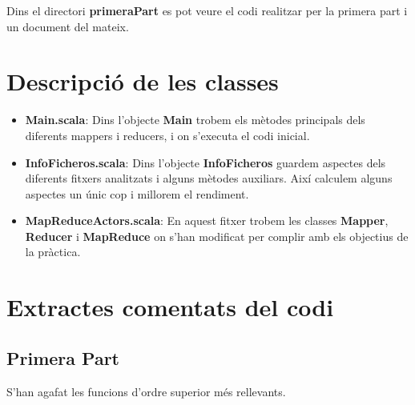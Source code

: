 \documentclass[11pt,a4paper]{article}
\begin{document}
Dins el directori \textbf{primeraPart} es pot veure el codi realitzar per la primera part i un document del mateix.

\section{Descripció de les classes}

\begin{itemize}

	\item \textbf{Main.scala}: Dins l'objecte \textbf{Main} trobem els mètodes principals dels diferents mappers i reducers, i on s'executa el codi inicial.
	\item \textbf{InfoFicheros.scala}: Dins l'objecte \textbf{InfoFicheros} guardem aspectes dels diferents fitxers analitzats i alguns mètodes auxiliars. Així calculem alguns aspectes un únic cop i millorem el rendiment.
	\item \textbf{MapReduceActors.scala}: En aquest fitxer trobem les classes \textbf{Mapper}, \textbf{Reducer} i \textbf{MapReduce} on s'han modificat per complir amb els objectius de la pràctica.
\end{itemize}


\section{Extractes comentats del codi}

	\subsection{Primera Part}
		S'han agafat les funcions d'ordre superior més rellevants.
	
\end{document}
